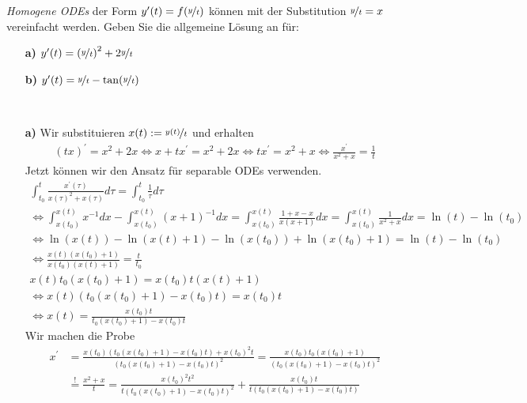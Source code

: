 \begin{exercise}
\textit{Homogene ODEs} der Form $y^{\prime}(t) = f(\nicefrac{y}{t})$
können mit der Substitution $\nicefrac{y}{t} = x$ vereinfacht werden.
Geben Sie die allgemeine Lösung an für:
\begin{itemize}
  \item [\textbf{a)}] $y^{\prime}(t) = \left(\nicefrac{y}{t}\right)^2
  + 2\nicefrac{y}{t}$
  \item [\textbf{b)}] $y^{\prime}(t) = \nicefrac{y}{t} - \tan(\nicefrac{y}{t})$
\end{itemize}
\end{exercise}
\begin{solution}
\leavevmode \\
\begin{itemize}
  \item [\textbf{a)}] Wir substituieren $x(t) := \nicefrac{y(t)}{t}$ und erhalten
  \begin{align*}
    (tx)^{\prime} = x^2 + 2x \iff x + tx^\prime = x^2 + 2x \iff t x^\prime = x^2 + x \iff \frac{x^{\prime}}{x^2 + x} = \frac{1}{t}
  \end{align*}
  Jetzt können wir den Ansatz für separable ODEs verwenden.
  \begin{gather*}
    \int_{t_0}^t \frac{x^{\prime}(\tau)}{x(\tau)^2 + x(\tau)}d\tau = \int_{t_0}^t \frac{1}{\tau}d\tau \\
    \iff \int_{x(t_0)}^{x(t)} x^{-1} dx - \int_{x(t_0)}^{x(t)} (x + 1)^{-1} dx = \int_{x(t_0)}^{x(t)} \frac{1 + x - x}{x(x + 1)} dx = \int_{x(t_0)}^{x(t)} \frac{1}{x^2 + x}dx = \ln(t) - \ln(t_0)\\
    \iff \ln(x(t)) - \ln(x(t) + 1) - \ln(x(t_0)) + \ln(x(t_0) + 1) = \ln(t) - \ln(t_0)\\
    \iff \frac{x(t)(x(t_0) + 1)}{x(t_0)(x(t) + 1)} = \frac{t}{t_0} \\
    x(t)t_0(x(t_0) + 1) = x(t_0)t(x(t) + 1) \\
    \iff x(t)(t_0(x(t_0) + 1) - x(t_0)t) = x(t_0)t \\
    \iff x(t) = \frac{x(t_0)t}{t_0(x(t_0) + 1) - x(t_0)t}
  \end{gather*}
  Wir machen die Probe
  \begin{align*}
    x^{\prime} &= \frac{x(t_0)(t_0(x(t_0) + 1) - x(t_0)t) + x(t_0)^2t}{(t_0(x(t_0) + 1) - x(t_0)t)^2}
    = \frac{x(t_0)t_0(x(t_0) + 1)}{(t_0(x(t_0) + 1) - x(t_0)t)^2}\\
    &\stackrel{!}{=} \frac{x^2 + x}{t}
    = \frac{x(t_0)^2t^2}{t(t_0(x(t_0) + 1) - x(t_0)t)^2} + \frac{x(t_0)t}{t(t_0(x(t_0) + 1) - x(t_0)t)} \\

\end{align*}
\end{itemize}
\end{solution}
